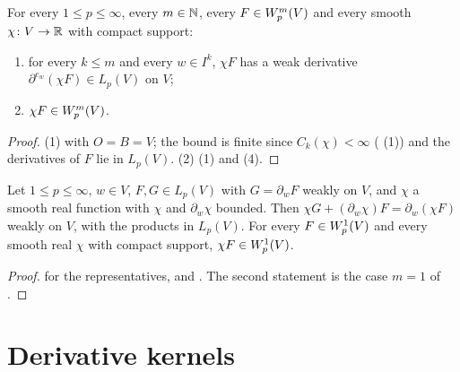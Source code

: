 \begin{corollary}
\label{cor:sobolev-multiplier}
\leanok
{}
For every $1 \leq p \leq \infty$, every $m \in \mathbb{N}$, every $F \in W^{m}_{p}(V)$ and every smooth
$\chi \colon V \to \mathbb{R}$ with compact support:
\begin{enumerate}
  \item for every $k \leq m$ and every $w \in I^k$, $\chi F$ has a weak derivative
    $\partial^{e_w} (\chi F) \in L_p(V)$ on $V$;
  \item $\chi F \in W^{m}_{p}(V)$.
\end{enumerate}
\end{corollary}

\begin{proof}
\leanok
(1)  with $O = B = V$; the bound is finite since $C_k(\chi) < \infty$
( (1)) and the derivatives of $F$ lie in $L_p(V)$. (2) (1) and
 (4).
\end{proof}

\begin{lemma}
\label{lem:product-rule-lp}
\leanok
{}
Let $1 \leq p \leq \infty$, $w \in V$, $F, G \in L_p(V)$ with $G = \partial_w F$ weakly on $V$,
and $\chi$ a smooth real function with $\chi$ and $\partial_w \chi$ bounded. Then
$\chi G + (\partial_w \chi) F = \partial_w (\chi F)$ weakly on $V$, with the products in
$L_p(V)$. For every $F \in W^{1}_{p}(V)$ and every smooth real $\chi$ with compact support,
$\chi F \in W^{1}_{p}(V)$.
\end{lemma}

\begin{proof}
\leanok
{} for the representatives, and
. The second statement is the case $m = 1$ of
.
\end{proof}

\section{Derivative kernels}
\label{sec:derivative-kernels}

